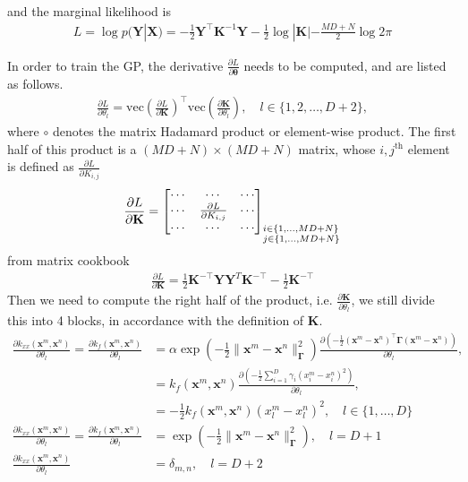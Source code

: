 \documentclass[10pt,oneside,a4paper,notitlepage]{article}
\newcommand{\vect}[1]{\mathbf{#1}}
\begin{document}
and the marginal likelihood is
\begin{align}
L = \log p(\vect Y|\vect X) = -\frac{1}{2}\vect Y^\top \vect K^{-1}\vect Y - \frac{1}{2}\log|\vect K| - \frac{MD+N}{2}\log2\pi
\end{align}

In order to train the GP, the derivative $\frac{\partial L}{\partial\boldsymbol\theta}$ needs to be computed, and are listed as follows.
\begin{align}
\frac{\partial L }{\partial\theta_l} = \mathrm{vec}\left(\frac{\partial L}{\partial\vect K}\right)^\top\mathrm{vec}\left(\frac{\partial\vect K}{\partial \theta_l}\right) , \quad l\in\{1,2,\ldots,D+2\},
\end{align}
where $\circ$ denotes the matrix Hadamard product or element-wise product. 
The first half of this product is a $(MD+N)\times(MD+N)$ matrix, whose $i,j^\mathrm{th}$ element is defined as $\frac{\partial L}{\partial K_{i,j}}$
\begin{align}
\frac{\partial L }{\partial \vect K} = \begin{bmatrix} \cdots & \cdots & \cdots \\ \cdots & \frac{\partial L}{\partial K_{i,j}} & \cdots \\ \cdots & \cdots & \cdots \end{bmatrix}_{\begin{subarray}{l}i\in\{1,\ldots,MD+N\}\\ j\in\{1,\ldots,MD+N\}\end{subarray}} 
\end{align}
from matrix cookbook
\begin{align}
\frac{\partial L}{\partial \vect K} =  \frac{1}{2}\vect K^{-\top}\vect Y\vect Y^T\vect K^{-\top} - \frac{1}{2} \vect K^{-\top}
\end{align}
Then we need to compute the right half of the product, i.e. $\frac{\partial \vect K}{\partial \theta_l}$, we still divide this into 4 blocks, in accordance with the definition of $\vect K$.
\begin{align}
\frac{\partial k_{xx}(\vect x^m, \vect x^n)}{\partial\theta_l}= \frac{\partial k_f(\vect x^m, \vect x^n)}{\partial\theta_l} &= \alpha\exp\left(-\frac{1}{2}\|\vect x^m - \vect x^n\|_{\boldsymbol\Gamma}^2\right)\frac{\partial\left(-\frac{1}{2}(\vect x^m - \vect x^n)^\top\boldsymbol\Gamma(\vect x^m - \vect x^n)\right)}{\partial\theta_l}, \\
&=k_f(\vect x^m, \vect x^n) \frac{\partial\left(-\frac{1}{2}\sum_{i=1}^D\gamma_i(x^m_i - x^n_i)^2\right)}{\partial\theta_l},\\ 
&=-\frac{1}{2}k_f(\vect x^m, \vect x^n)(x^m_l - x^n_l)^2, \quad l\in\{1,\ldots,D\} \\
\frac{\partial k_{xx}(\vect x^m, \vect x^n)}{\partial\theta_l}= \frac{\partial k_f(\vect x^m, \vect x^n)}{\partial\theta_l} &=\exp\left(-\frac{1}{2}\|\vect x^m - \vect x^n\|_{\boldsymbol\Gamma}^2\right) ,\quad l=D+1 \\
\frac{\partial k_{xx}(\vect x^m, \vect x^n)}{\partial\theta_l}&=\delta_{m,n},\quad l=D+2 
\end{align}
\end{document}
